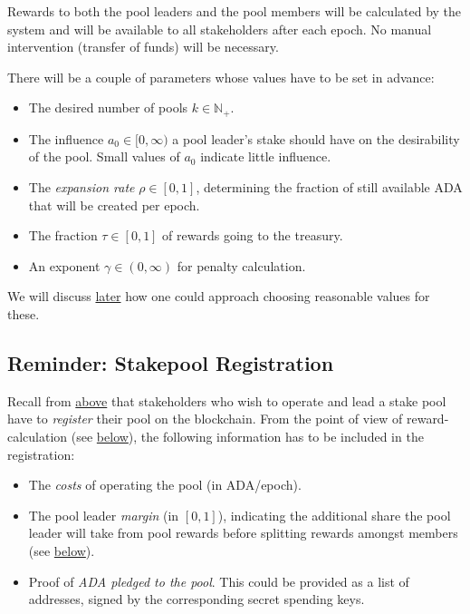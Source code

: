 \documentclass[11pt,a4paper]{article}
\begin{document}
Rewards to both the pool leaders and the pool members will be calculated
by the system and will be available to all stakeholders after each
epoch. No manual intervention (transfer of funds) will be necessary.


There will be a couple of parameters whose values have to be set in
advance:

\begin{itemize}
\item
  The desired number of pools \(k\in\mathbb{N}_+\).
\item
  The influence \(a_0\in[0,\infty)\) a pool leader's stake should have
  on the desirability of the pool. Small values of \(a_0\) indicate
  little influence.
\item
  The \emph{expansion rate} \(\rho\in[0,1]\), determining the fraction
  of still available ADA that will be created per epoch.
\item
  The fraction \(\tau\in[0,1]\) of rewards going to the treasury.
\item
  An exponent \(\gamma\in(0,\infty)\) for penalty calculation.
\end{itemize}

We will discuss
\hyperref[deciding-on-good-values-for-the-parameters]{later} how one
could approach choosing reasonable values for these.

\subsection{Reminder: Stakepool
Registration}\label{reminder-stakepool-registration}

Recall from \hyperref[stakepool-registration]{above} that stakeholders
who wish to operate and lead a stake pool have to \emph{register} their
pool on the blockchain. From the point of view of reward-calculation
(see \hyperref[epoch-rewards]{below}), the following information has to
be included in the registration:

\begin{itemize}
\item
  The \emph{costs} of operating the pool (in ADA/epoch).
\item
  The pool leader \emph{margin} (in \([0,1]\)), indicating the
  additional share the pool leader will take from pool rewards before
  splitting rewards amongst members (see
  \hyperref[pool-leader-reward]{below}).
\item
  Proof of \emph{ADA pledged to the pool}. This could be provided as a
  list of addresses, signed by the corresponding secret spending keys.
\end{itemize}
\end{document}
